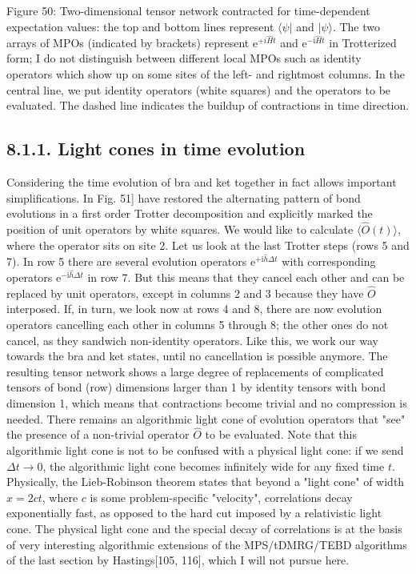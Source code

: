 \documentclass[12pt]{article}
\begin{document}
Figure 50: Two-dimensional tensor network contracted for time-dependent expectation values: the top and bottom lines represent $\langle\psi|$ and $|\psi\rangle$. The two arrays of MPOs (indicated by brackets) represent $\mathrm{e}^{+i \hat{H} t}$ and $\mathrm{e}^{-\mathrm{i} \hat{H} t}$ in Trotterized form; I do not distinguish between different local MPOs such as identity operators which show up on some sites of the left- and rightmost columns. In the central line, we put identity operators (white squares) and the operators to be evaluated. The dashed line indicates the buildup of contractions in time direction.

\subsection*{8.1.1. Light cones in time evolution}
Considering the time evolution of bra and ket together in fact allows important simplifications. In Fig. 51] have restored the alternating pattern of bond evolutions in a first order Trotter decomposition and explicitly marked the position of unit operators by white squares. We would like to calculate $\langle\hat{O}(t)\rangle$, where the operator sits on site 2. Let us look at the last Trotter steps (rows 5 and 7). In row 5 there are several evolution operators $\mathrm{e}^{+\mathrm{i} \hat{h} \Delta t}$ with corresponding operators $\mathrm{e}^{-\mathrm{i} \hat{h} \Delta t}$ in row 7. But this means that they cancel each other and can be replaced by unit operators, except in columns 2 and 3 because they have $\hat{O}$ interposed. If, in turn, we look now at rows 4 and 8, there are now evolution operators cancelling each other in columns 5 through 8; the other ones do not cancel, as they sandwich non-identity operators. Like this, we work our way towards the bra and ket states, until no cancellation is possible anymore. The resulting tensor network shows a large degree of replacements of complicated tensors of bond (row) dimensions larger than 1 by identity tensors with bond dimension 1, which means that contractions become trivial and no compression is needed. There remains an algorithmic light cone of evolution operators that "see" the presence of a non-trivial operator $\hat{O}$ to be evaluated. Note that this algorithmic light cone is not to be confused with a physical light cone: if we send $\Delta t \rightarrow 0$, the algorithmic light cone becomes infinitely wide for any fixed time $t$. Physically, the Lieb-Robinson theorem states that beyond a "light cone" of width $x=2 c t$, where $c$ is some problem-specific "velocity", correlations decay exponentially fast, as opposed to the hard cut imposed by a relativistic light cone. The physical light cone and the special decay of correlations is at the basis of very interesting algorithmic extensions of the MPS/tDMRG/TEBD algorithms of the last section by Hastings[105, 116], which I will not pursue here.
\end{document}
